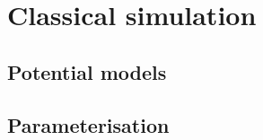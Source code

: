 \section{Classical simulation}
\label{sec:classical}

\subsection{Potential models}

\subsection{Parameterisation}
